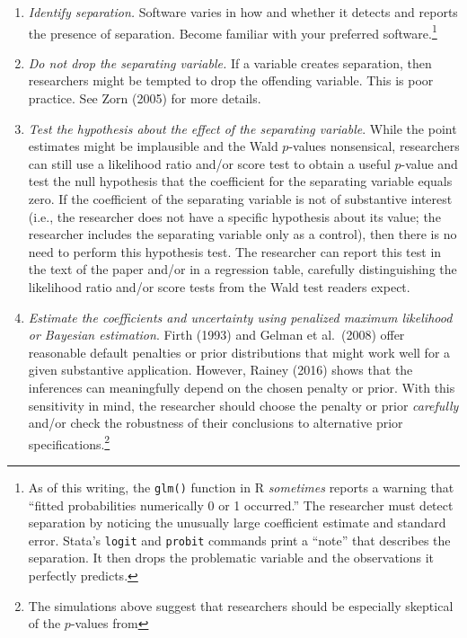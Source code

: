 \documentclass[
]{article}
\providecommand{\tightlist}{%
  \setlength{\itemsep}{0pt}\setlength{\parskip}{0pt}}
\begin{document}
\begin{enumerate}
\def\labelenumi{\arabic{enumi}.}
\tightlist
\item
  \emph{Identify separation.} Software varies in how and whether it
  detects and reports the presence of separation. Become familiar with
  your preferred software.\footnote{As of this writing, the
    \texttt{glm()} function in R \emph{sometimes} reports a warning that
    ``fitted probabilities numerically 0 or 1 occurred.'' The researcher
    must detect separation by noticing the unusually large coefficient
    estimate and standard error. Stata's \texttt{logit} and
    \texttt{probit} commands print a ``note'' that describes the
    separation. It then drops the problematic variable and the
    observations it perfectly predicts.}
\item
  \emph{Do not drop the separating variable.} If a variable creates
  separation, then researchers might be tempted to drop the offending
  variable. This is poor practice. See Zorn (2005) for more details.
\item
  \emph{Test the hypothesis about the effect of the separating
  variable}. While the point estimates might be implausible and the Wald
  \(p\)-values nonsensical, researchers can still use a likelihood ratio
  and/or score test to obtain a useful \(p\)-value and test the null
  hypothesis that the coefficient for the separating variable equals
  zero. If the coefficient of the separating variable is not of
  substantive interest (i.e., the researcher does not have a specific
  hypothesis about its value; the researcher includes the separating
  variable only as a control), then there is no need to perform this
  hypothesis test. The researcher can report this test in the text of
  the paper and/or in a regression table, carefully distinguishing the
  likelihood ratio and/or score tests from the Wald test readers expect.
\item
  \emph{Estimate the coefficients and uncertainty using penalized
  maximum likelihood or Bayesian estimation}. Firth (1993) and Gelman et
  al.~(2008) offer reasonable default penalties or prior distributions
  that might work well for a given substantive application. However,
  Rainey (2016) shows that the inferences can meaningfully depend on the
  chosen penalty or prior. With this sensitivity in mind, the researcher
  should choose the penalty or prior \emph{carefully} and/or check the
  robustness of their conclusions to alternative prior
  specifications.\footnote{The simulations above suggest that
    researchers should be especially skeptical of the \(p\)-values from
}
\end{enumerate}
\end{document}
